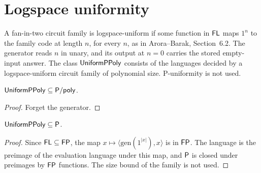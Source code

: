 \section{Logspace uniformity}
\label{sec:circuits-uniform}

\begin{definition}
  \label{def:UniformPPoly}
  \leanok
  A fan-in-two circuit family is logspace-uniform if some function in
  $\mathsf{FL}$ maps $1^n$ to the family code at length $n$, for every $n$, as in
  Arora--Barak, Section~6.2. The generator reads $n$ in unary, and its
  output at $n = 0$ carries the stored empty-input answer. The class
  $\mathsf{UniformPPoly}$ consists of the languages decided by a logspace-uniform
  circuit family of polynomial size. P-uniformity is not used.
\end{definition}

\begin{proposition}
  \label{prop:circuits-uniform-subset-ppoly}
  \leanok
  $\mathsf{UniformPPoly} \subseteq \mathsf{P/poly}$.
\end{proposition}
\begin{proof}
  \leanok
  Forget the generator.
\end{proof}

\begin{theorem}
  \label{thm:circuits-uniform-subset-p}
  \leanok
  $\mathsf{UniformPPoly} \subseteq \mathsf{P}$.
\end{theorem}
\begin{proof}
  \leanok
  Since $\mathsf{FL} \subseteq \mathsf{FP}$, the map
  $x \mapsto \langle \mathrm{gen}(1^{|x|}), x \rangle$ is in $\mathsf{FP}$. The
  language is the preimage of the evaluation language under this map, and
  $\mathsf{P}$ is closed under preimages by $\mathsf{FP}$ functions. The size bound of
  the family is not used.
\end{proof}

